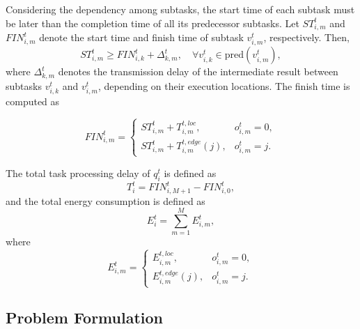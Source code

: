 \documentclass[conference]{IEEEtran}
\begin{document}
Considering the dependency among subtasks, the start time of each subtask must be later than the completion time of all its predecessor subtasks. Let $ST_{i,m}^t$ and $FIN_{i,m}^t$ denote the start time and finish time of subtask $v_{i,m}^t$, respectively. Then,
\begin{equation}
ST_{i,m}^t \geq FIN_{i,k}^t + \Delta_{k,m}^t,
\quad \forall v_{i,k}^t \in \mathrm{pred}(v_{i,m}^t),
\end{equation}
where $\Delta_{k,m}^t$ denotes the transmission delay of the intermediate result between subtasks $v_{i,k}^t$ and $v_{i,m}^t$, depending on their execution locations. The finish time is computed as

\begin{equation}
\label{eq:finish_time}
FIN_{i,m}^t =
\begin{cases}
ST_{i,m}^t + T_{i,m}^{t,loc}, & o_{i,m}^t=0,\\
ST_{i,m}^t + T_{i,m}^{t,edge}(j), & o_{i,m}^t=j.
\end{cases}
\end{equation}

The total task processing delay of $q_i^t$ is defined as
\begin{equation}
T_i^t
=
FIN_{i,M+1}^t
-
FIN_{i,0}^t,
\end{equation}
and the total energy consumption is defined as
\begin{equation}
E_i^t=\sum_{m=1}^{M} E_{i,m}^t,
\end{equation}
where
\begin{equation}
E_{i,m}^t =
\begin{cases}
E_{i,m}^{t,loc}, & o_{i,m}^t=0,\\
E_{i,m}^{t,edge}(j), & o_{i,m}^t=j.
\end{cases}
\end{equation}

\subsection{Problem Formulation}
\end{document}
